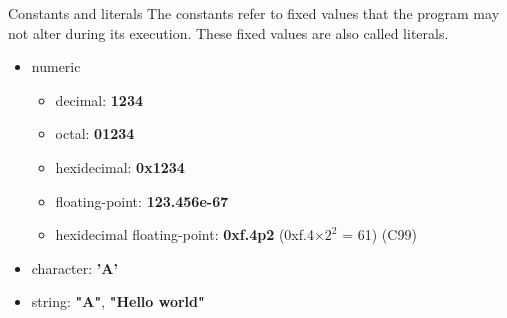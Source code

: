 \begin{frame}{Constants and literals}
    The constants refer to fixed values that the program may not alter during its execution. These fixed values are also called literals.
    \begin{itemize}
        \item numeric
            \begin{itemize}
                \item decimal: \textbf{1234}
                \item octal: \textbf{01234}
                \item hexidecimal: \textbf{0x1234}
                \item floating-point: \textbf{123.456e-67}
                \item hexidecimal floating-point: \textbf{0xf.4p2} (0xf.4$\times{2}^2$ = 61) (C99)
            \end{itemize}
        \item character: \textbf{'A'}
        \item string: \textbf{"A"}, \textbf{"Hello world"}
    \end{itemize}
\end{frame}

